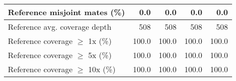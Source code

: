 \documentclass[12pt,a4paper]{article}
\begin{document}
\begin{table}[ht]
\begin{center}
\begin{tabular}{|l*{4}{|r}|}
Reference misjoint mates (\%) & 0.0 & 0.0 & 0.0 & 0.0 \\ \hline
Reference avg. coverage depth & 508 & 508 & 508 & 508 \\ \hline
Reference coverage $\geq$ 1x (\%) & 100.0 & 100.0 & 100.0 & 100.0 \\ \hline
Reference coverage $\geq$ 5x (\%) & 100.0 & 100.0 & 100.0 & 100.0 \\ \hline
Reference coverage $\geq$ 10x (\%) & 100.0 & 100.0 & 100.0 & 100.0 \\ \hline
\end{tabular}
\end{center}
\end{table}
\end{document}
